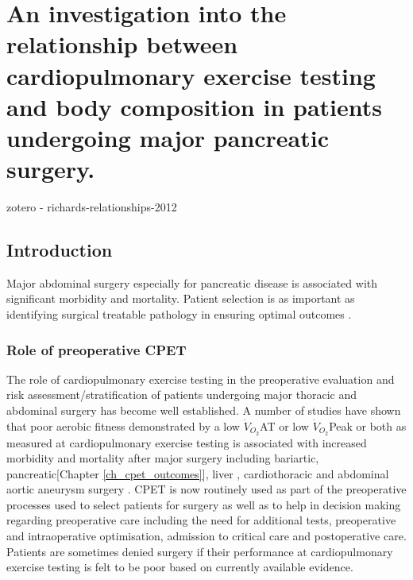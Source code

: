 \chapter{An investigation into the relationship between cardiopulmonary exercise testing and body composition in patients undergoing major pancreatic surgery.}
\label{ch_bodycomp}


\clearpage

zotero - richards-relationships-2012

\section{Introduction}
Major abdominal surgery especially for pancreatic disease is associated with significant morbidity and mortality. Patient selection is as important as identifying surgical treatable pathology in ensuring optimal outcomes \parencite{balthazar_acute_2002}.

\subsection{Role of preoperative CPET}
The role of cardiopulmonary exercise testing in the preoperative evaluation and risk assessment/stratification of patients undergoing major thoracic and abdominal surgery has become well established. A number of studies have shown that poor aerobic fitness demonstrated by a low $\dot{V}_{O_2}$AT or low $\dot{V}_{O_2}$Peak or both as measured at cardiopulmonary exercise testing is associated with increased morbidity and mortality after major surgery including bariartic\parencite{mccullough_cardiorespiratory_2006}, pancreatic\parencite{ausania_effects_2012}[Chapter \ref{ch_cpet_outcomes}], liver \parencite{epstein_aerobic_2004}, cardiothoracic\parencite{brunelli_risk_2010, campione_oxygen_2010,torchio_exercise_2010} and abdominal aortic aneurysm surgery \parencite{carlisle_mid-term_2007,thompson_cardiopulmonary_2011}. CPET is now routinely used as part of the preoperative processes used to select patients for surgery as well as to help in decision making regarding preoperative care including the need for additional tests, preoperative and intraoperative optimisation, admission to critical care and postoperative care.
Patients are sometimes denied surgery if their performance at cardiopulmonary exercise testing is felt to be poor based on currently available evidence.

